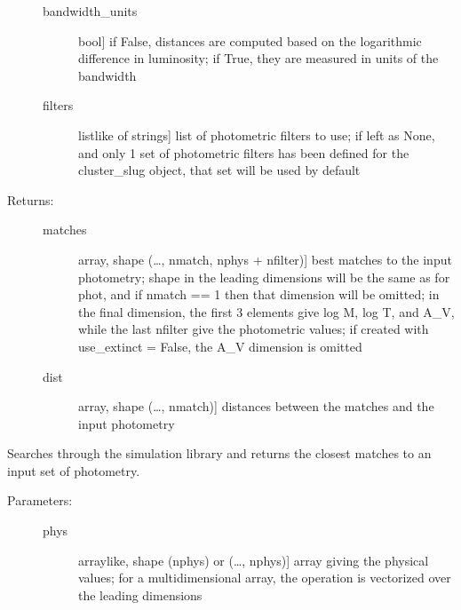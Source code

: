 \documentclass[letterpaper,10pt,english]{sphinxmanual}
\begin{document}
\begin{fulllineitems}
\begin{fulllineitems}
\begin{description}
\begin{description}
\item[{bandwidth\_units}] \leavevmode{[}bool{]}
if False, distances are computed based on the
logarithmic difference in luminosity; if True, they are
measured in units of the bandwidth

\item[{filters}] \leavevmode{[}listlike of strings{]}
list of photometric filters to use; if left as None, and
only 1 set of photometric filters has been defined for
the cluster\_slug object, that set will be used by
default

\end{description}

\item[{Returns:}] \leavevmode\begin{description}
\item[{matches}] \leavevmode{[}array, shape (…, nmatch, nphys + nfilter){]}
best matches to the input photometry; shape in the
leading dimensions will be the same as for phot, and if
nmatch == 1 then that dimension will be omitted; in the
final dimension, the first 3 elements give log M, log T,
and A\_V, while the last nfilter give the photometric
values; if created with use\_extinct = False, the A\_V
dimension is omitted

\item[{dist}] \leavevmode{[}array, shape (…, nmatch){]}
distances between the matches and the input photometry

\end{description}

\end{description}

\end{fulllineitems}


\begin{fulllineitems}
\label{\detokenize{cluster_slug:slugpy.cluster_slug.cluster_slug.bestmatch_phys}}
Searches through the simulation library and returns the closest
matches to an input set of photometry.
\begin{description}
\item[{Parameters:}] \leavevmode\begin{description}
\item[{phys}] \leavevmode{[}arraylike, shape (nphys) or (…, nphys){]}
array giving the physical values; for a
multidimensional array, the operation is vectorized over
the leading dimensions


\end{description}
\end{description}
\end{fulllineitems}
\end{fulllineitems}
\end{document}
